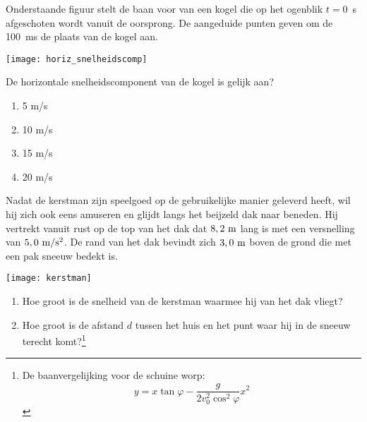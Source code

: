 \documentclass{ximera}
\begin{document}
\begin{exercise} Onderstaande figuur stelt de baan voor van
een kogel die op het ogenblik \mbox{$t=0$~s} afgeschoten wordt
vanuit de oorsprong. De aangeduide punten geven om de \mbox{100 ms}
de plaats van de kogel aan.
\begin{image}
\texttt{[image: horiz\_snelheidscomp]}
\end{image}


De horizontale snelheidscomponent van de kogel is gelijk aan?
\begin{enumerate}
\item 5 m/s
\item 10 m/s
\item 15 m/s
\item 20 m/s
\end{enumerate}

\end{exercise}

\begin{exercise} Nadat de kerstman zijn speelgoed op de
gebruikelijke manier geleverd heeft, wil hij zich ook eens amuseren
en glijdt langs het beijzeld dak naar beneden. Hij vertrekt vanuit
rust op de top van het dak dat $8,2~\rm m$ lang is met een
versnelling van $5,0~\rm m/s^2$. De rand van het dak bevindt zich
$3,0~\rm m$ boven de grond die met een pak sneeuw bedekt is.
\begin{image}
\texttt{[image: kerstman]}
\end{image}
\begin{enumerate}
\item Hoe groot is de snelheid van de kerstman waarmee hij van het
dak vliegt?
\item Hoe groot is de afstand $d$ tussen het huis en het punt waar
hij in de sneeuw terecht komt?\footnote{De baanvergelijking voor de
schuine worp:
\[
y=x\tan\varphi-\frac{g}{2v_0^2\cos^2\varphi}x^2
\]}
\end{enumerate}

\end{exercise}
\end{document}
